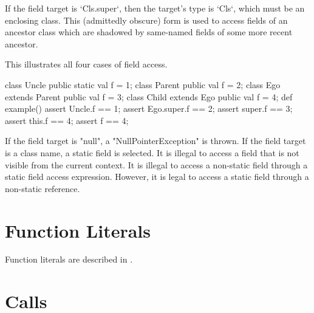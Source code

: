If the field target is \xcd`Cls.super`, then the target's type is \xcd`Cls`,
which must be an  enclosing class.  This (admittedly
obscure) form is used to access fields of an ancestor class which are shadowed
by same-named fields of some more recent ancestor.  

\begin{ex}
This illustrates all four cases of field access.
\begin{xten}
class Uncle {
  public static val f = 1;
}
class Parent {
  public val f = 2;
}
class Ego extends Parent {
  public val f = 3;
  class Child extends Ego {
     public val f = 4;
     def example() { 
        assert Uncle.f == 1; 
        assert Ego.super.f == 2;
        assert super.f == 3;
        assert this.f == 4;
        assert f == 4;
     }
  }
}
\end{xten}
\end{ex}

If the field target is \xcd"null", a \xcd"NullPointerException"
is thrown.
If the field target is a class name, a static field is selected.
It is illegal to access  a field that is not visible from
the current context.
It is illegal to access a non-static field
through a static field access expression.  However, it is legal to access a
static field through a non-static reference.

\section{Function Literals}
Function literals are described in .

\section{Calls}
\label{Call}
\label{MethodInvocation}
\label{MethodInvocationSubstitution}

